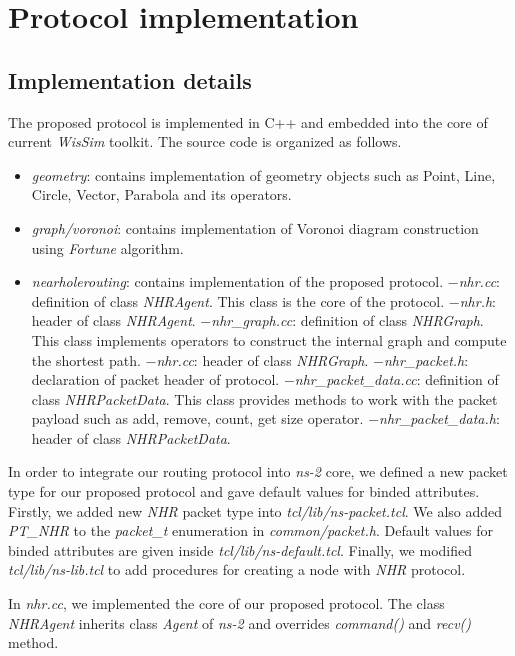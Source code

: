 \chapter{Protocol implementation}\label{chapter6}
\section{Implementation details}
The proposed protocol is implemented in C++ and embedded into the core of current \emph{WisSim} toolkit. The source code is organized as follows.
\begin{itemize}
\item \emph{geometry}: contains implementation of geometry objects such as Point, Line, Circle, Vector, Parabola and its operators.
\item \emph{graph/voronoi}: contains implementation of Voronoi diagram construction using \emph{Fortune} algorithm.
\item \emph{nearholerouting}: contains implementation of the proposed protocol.
\subitem $-$\emph{nhr.cc}: definition of class \emph{NHRAgent}. This class is the core of the protocol.
\subitem $-$\emph{nhr.h}: header of class \emph{NHRAgent}.
\subitem $-$\emph{nhr\_graph.cc}: definition of class \emph{NHRGraph}. This class implements operators to construct the internal graph and compute the shortest path.
\subitem $-$\emph{nhr.cc}: header of class \emph{NHRGraph}.
\subitem $-$\emph{nhr\_packet.h}: declaration of packet header of protocol.
\subitem $-$\emph{nhr\_packet\_data.cc}: definition of class \emph{NHRPacketData}. This class provides methods to work with the packet payload such as add, remove, count, get size operator.
\subitem $-$\emph{nhr\_packet\_data.h}: header of class \emph{NHRPacketData}.
\end{itemize}

In order to integrate our routing protocol into \emph{ns-2} core, we defined a new packet type for our proposed protocol and gave default values for binded attributes.
Firstly, we added new \emph{NHR} packet type into \emph{tcl/lib/ns-packet.tcl}. We also added \emph{PT\_NHR} to the \emph{packet\_t} enumeration in \emph{common/packet.h}. Default values for binded attributes are given inside \emph{tcl/lib/ns-default.tcl}. Finally, we modified \emph{tcl/lib/ns-lib.tcl} to add procedures for creating a node with \emph{NHR} protocol.

In \emph{nhr.cc}, we implemented the core of our proposed protocol. The class \emph{NHRAgent} inherits class \emph{Agent} of \emph{ns-2} and overrides \emph{command()} and \emph{recv()} method.

